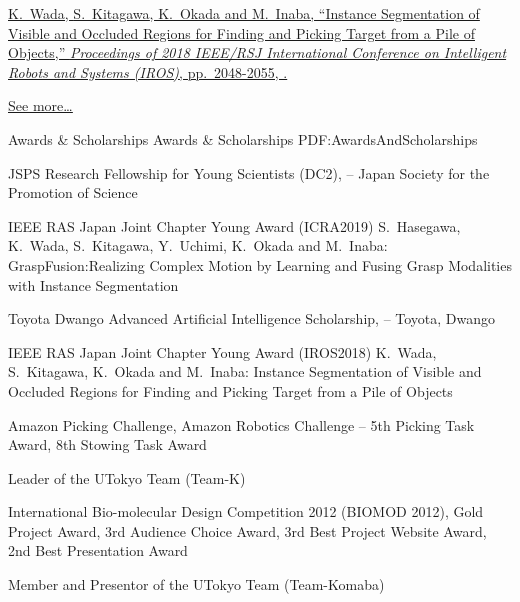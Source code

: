 \documentclass[letterpaper,MMMyyyy,nonstopmode]{simpleresumecv}
\begin{document}
\begin{Body}
\BulletItem
\href{https://doi.org/10.1109/IROS.2018.8593690}
{K.~Wada, \underline{S.~Kitagawa}, K.~Okada and M.~Inaba,
``Instance Segmentation of Visible and Occluded Regions for Finding and Picking Target from a Pile of Objects,''
\textit{Proceedings of 2018 IEEE/RSJ International Conference on Intelligent Robots and Systems (IROS)},
pp.~2048-2055,
.}

\hfill
\href{https://scholar.google.com/citations?user=deAeiIkAAAAJ}{\underline{See more…}}

\endgroup


\Section
{Awards \&\newline
Scholarships}
{Awards \& Scholarships}
{PDF:AwardsAndScholarships}

\BulletItem
JSPS Research Fellowship for Young Scientists (DC2),
\hfill
{} --
\newline
Japan Society for the Promotion of Science

 IEEE RAS Japan Joint Chapter Young Award (ICRA2019)
\hfill
{}
\newline
S.~Hasegawa, K.~Wada, S.~Kitagawa, Y.~Uchimi, K.~Okada and M.~Inaba:
GraspFusion:Realizing Complex Motion by Learning and Fusing Grasp Modalities with Instance Segmentation

\BulletItem
Toyota Dwango Advanced Artificial Intelligence Scholarship,
\hfill
{} --
\newline
Toyota, Dwango

 IEEE RAS Japan Joint Chapter Young Award (IROS2018)
\hfill
{}
\newline
K.~Wada, S.~Kitagawa, K.~Okada and M.~Inaba: Instance Segmentation of Visible and
Occluded Regions for Finding and Picking Target from a Pile of Objects

\BulletItem
Amazon Picking Challenge, Amazon Robotics Challenge
\hfill
{} --
\newline
5th Picking Task Award, 8th Stowing Task Award
\begin{Detail}
\Item
Leader of the UTokyo Team (Team-K)
\end{Detail}

\BulletItem
International Bio-molecular Design Competition 2012 (BIOMOD 2012),
\hfill
{}
\newline
Gold Project Award, 3rd Audience Choice Award, 3rd Best Project Website Award, 2nd Best Presentation Award
\begin{Detail}
\Item
Member and Presentor of the UTokyo Team (Team-Komaba)
\end{Detail}


\end{Body}
\end{document}
